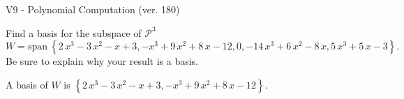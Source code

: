 \begin{exercise}
  \begin{exerciseTitle}V9 - Polynomial Computation (ver. 180)\end{exerciseTitle}
  \begin{exerciseStatement}
    Find a basis for the subspace of \(\mathcal{P}^3\) 
\[W=\mathrm{span}\ \left\{2 \, x^{3} - 3 \, x^{2} - x + 3 , -x^{3} + 9 \, x^{2} + 8 \, x - 12 , 0 , -14 \, x^{3} + 6 \, x^{2} - 8 \, x , 5 \, x^{3} + 5 \, x - 3\right\}.\]
 Be sure to explain why your result is a basis.


  \end{exerciseStatement}
  \begin{exerciseAnswer}
   A basis of \(W\) is  \(\left\{2 \, x^{3} - 3 \, x^{2} - x + 3 , -x^{3} + 9 \, x^{2} + 8 \, x - 12\right\}\).
  


  \end{exerciseAnswer}
\end{exercise}